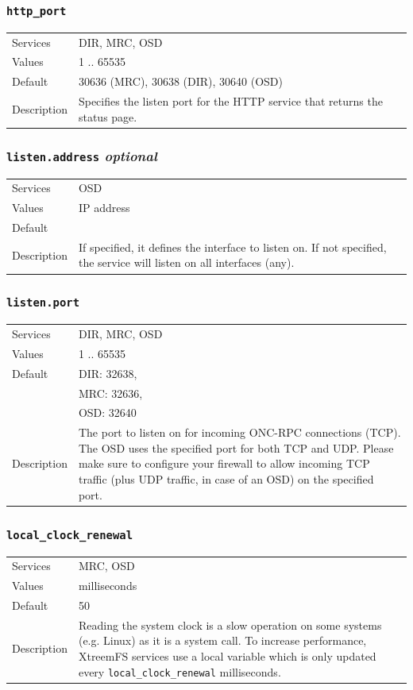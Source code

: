 \documentclass[a4paper,10pt]{book}
\begin{document}
\subsubsection{\texttt{http\_port}}
\begin{tabular}{lp{10cm}}
 Services & DIR, MRC, OSD\\
 Values   & 1 .. 65535 \\
 Default  & 30636 (MRC), 30638 (DIR), 30640 (OSD)\\
 Description & Specifies the listen port for the HTTP service that returns the status page.
\end{tabular}

\subsubsection{\texttt{listen.address} \textit{optional}}
\begin{tabular}{lp{10cm}}
 Services & OSD\\
 Values   & IP address \\
 Default  & \\
 Description & If specified, it defines the interface to listen on. If not specified, the service will listen on all interfaces (any).
\end{tabular}

\subsubsection{\texttt{listen.port}}
\begin{tabular}{lp{10cm}}
 Services & DIR, MRC, OSD\\
 Values   & 1 .. 65535 \\
 Default  & DIR: 32638,\\
 & MRC: 32636,\\
 & OSD: 32640 \\
 Description & The port to listen on for incoming ONC-RPC connections (TCP). The OSD uses the specified port for both TCP and UDP. Please make sure to configure your firewall to allow incoming TCP traffic (plus UDP traffic, in case of an OSD) on the specified port.
\end{tabular}

\subsubsection{\texttt{local\_clock\_renewal}}
\begin{tabular}{lp{10cm}}
 Services & MRC, OSD\\
 Values   & milliseconds \\
 Default  & 50\\
 Description & Reading the system clock is a slow operation on some systems (e.g. Linux) as it is a system call. To increase performance, XtreemFS services use a local variable which is only updated every \texttt{local\_clock\_renewal} milliseconds.
\end{tabular}
\end{document}
